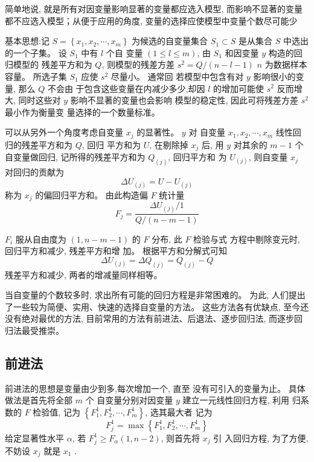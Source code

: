简单地说, 就是所有对因变量影响显著的变量都应选入模型, 而影响不显著的变量都不应选入模型；从便于应用的角度, 变量的选择应使模型中变量个数尽可能少

基本思想:记 \( {S}=\left\{{x}_{1}, {x}_{2}, \cdots, {x}_{m}\right\} \) 为候选的自变量集合
\( {S}_{1} \subset {S} \) 是从集合 \( {S} \) 中选出的一个子集。 设 \( {S}_{1} \) 中有 \( {l} \) 个自
变量 \( (1 \leq l \leq m) \), 由 \( S_{1} \) 和因变量 \( y \) 构造的回归模型的 残差平方和为 \( Q \), 则模型的残差方差 \( {s}^{2}={Q} /({n}-{l}-{1}) \)
\( {n} \) 为数据样本容量。 所选子集 \( {S}_{1} \) 应使 \( {s}^{2} \) 尽量小。 通常回
若模型中包含有对 \( y \) 影响很小的变量, 那么 \( Q \) 不会由 于包含这些变量在内减少多少,却因 \( l \) 的增加可能使 \( s^{2} \) 反而增大, 同时这些对 \( {y} \) 影响不显著的变量也会影响 模型的稳定性, 因此可将残差方差 \( {s}^{2} \) 最小作为衡量变
量选择的一个数量标准。 

可以从另外一个角度考虑自变量 \( {x}_{j} \) 的显著性。  \( {y} \) 对 自变量 \( {x}_{{1}}, {x}_{2}, \cdots, {x}_{m} \) 线性回归的残差平方和为 \( {Q} \), 回归
平方和为 \( U \), 在剔除掉 \( {x}_{j} \) 后, 用 \( {y} \) 对其余的 \( {m}-{1} \) 个自变量做回归, 记所得的残差平方和为 $ Q_{(j)} $, 回归平方和
为 \( U_{(j)} \), 则自变量 \( x_{j} \) 对回归的贡献为
$$
\Delta {U}_{(j)}={U}-{U}_{(j)}
$$
称为 \( {x}_{{j}} \) 的偏回归平方和。 由此构造偏 \( {F} \) 统计量
$$
F_{j}=\frac{\Delta U_{(j)} / 1}{Q /(n-m-1)}
$$

\( {F}_{i} \) 服从自由度为 \( ({1}, {n}-{m}-{1}) \) 的 \( {F} \) 分布, 此 \( {F} \) 检验与式
方程中剔除变元时, 回归平方和减少, 残差平方和增 加。 根据平方和分解式可知
$$
\Delta {U}_{(j)}=\Delta {Q}_{(j)}={Q}_{(j)}-{Q}
$$
残差平方和减少, 两者的增减量同样相等。 

当自变量的个数较多时, 求出所有可能的回归方程是非常困难的。 为此, 人们提出了一些较为简便、实用、快速的选择自变量的方法。 这些方法各有优缺点, 至今还没有绝对最优的方法, 目前常用的方法有前进法、后退法、逐步回归法, 而逐步回归法最受推崇。 

\subsection{前进法}

前进法的思想是变量由少到多,每次增加一个, 直至
没有可引入的变量为止。 具体做法是首先将全部 \( {m} \) 个 自变量分别对因变量 \( {y} \) 建立一元线性回归方程, 利用
归系数的 \( F \) 检验值, 记为 \( \left\{F_{1}^{1}, F_{2}^{1}, \cdots, F_{m}^{1}\right\} \), 选其最大者 记为
$$
F_{j}^{1}=\max \left\{F_{1}^{1}, F_{2}^{1}, \cdots, F_{m}^{1}\right\}
$$
给定显著性水平 \( \alpha \), 若 \( F_{j}^{1} \geq F_{\alpha}(1, n-2) \), 则首先将 \( {x}_{j} \) 引 入回归方程, 为了方便, 不妨设 \( {x}_{j} \) 就是 \( {x}_{1} \) . 

